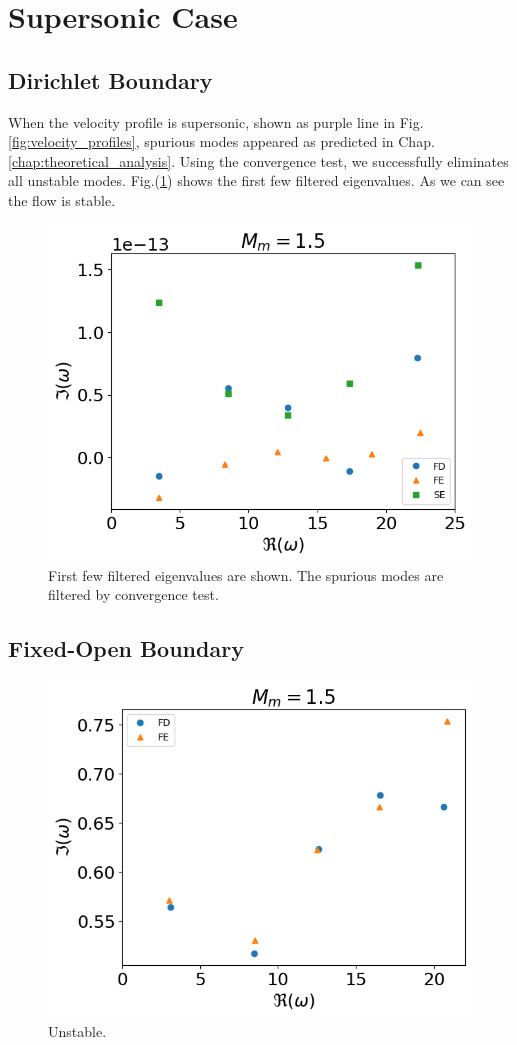 \section{Supersonic Case}
\subsection{Dirichlet Boundary}
When the velocity profile is supersonic, shown as purple line in Fig.\ref{fig:velocity_profiles}, spurious modes appeared as predicted in Chap.\ref{chap:theoretical_analysis}. Using the convergence test, we successfully eliminates all unstable modes. Fig.(\ref{fig:supersonic_v_dirichlet}) shows the first few filtered eigenvalues. As we can see the flow is stable.
\begin{figure} [H]
	\centering
	\includegraphics[width=0.7\linewidth]{img/numerical_experiments/fixed_fixed/supersonic_v}
	\caption{First few filtered eigenvalues are shown. The spurious modes are filtered by convergence test.}
	\label{fig:supersonic_v_dirichlet}
\end{figure}

\subsection{Fixed-Open Boundary}
\begin{figure} [H]
	\centering
	\includegraphics[width=0.7\linewidth]{img/numerical_experiments/fixed_open/supersonic_v}
	\caption{Unstable.}
	\label{fig:supersonic_v_fixed_open}
\end{figure}


